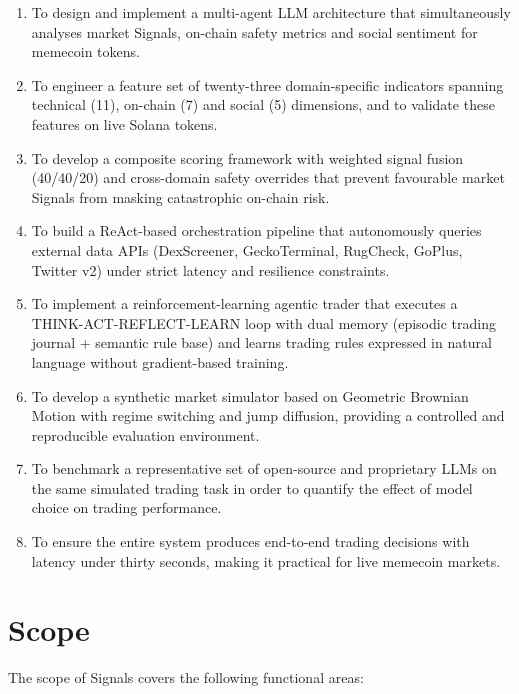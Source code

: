 \documentclass[12pt,a4paper,oneside,openany]{book}
\begin{document}
\begin{enumerate}[leftmargin=12mm]
\item To design and implement a multi-agent LLM architecture that simultaneously analyses market Signals, on-chain safety metrics and social sentiment for memecoin tokens.
\item To engineer a feature set of twenty-three domain-specific indicators spanning technical (11), on-chain (7) and social (5) dimensions, and to validate these features on live Solana tokens.
\item To develop a composite scoring framework with weighted signal fusion (40/40/20) and cross-domain safety overrides that prevent favourable market Signals from masking catastrophic on-chain risk.
\item To build a ReAct-based orchestration pipeline that autonomously queries external data APIs (DexScreener, GeckoTerminal, RugCheck, GoPlus, Twitter v2) under strict latency and resilience constraints.
\item To implement a reinforcement-learning agentic trader that executes a THINK-ACT-REFLECT-LEARN loop with dual memory (episodic trading journal + semantic rule base) and learns trading rules expressed in natural language without gradient-based training.
\item To develop a synthetic market simulator based on Geometric Brownian Motion with regime switching and jump diffusion, providing a controlled and reproducible evaluation environment.
\item To benchmark a representative set of open-source and proprietary LLMs on the same simulated trading task in order to quantify the effect of model choice on trading performance.
\item To ensure the entire system produces end-to-end trading decisions with latency under thirty seconds, making it practical for live memecoin markets.
\end{enumerate}

\section{Scope}
The scope of Signals covers the following functional areas:
\end{document}
